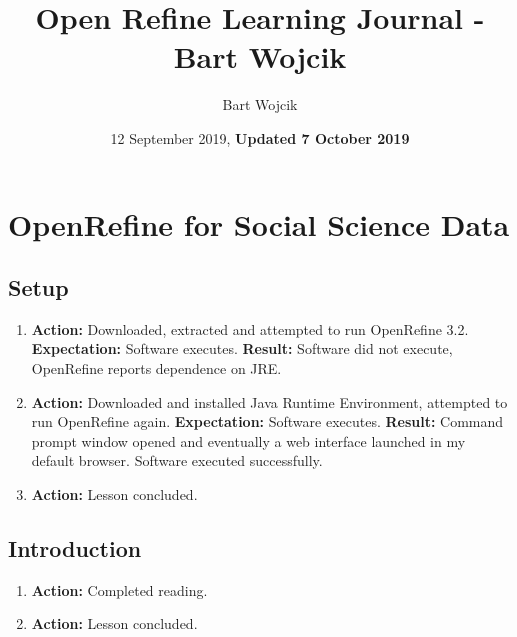 \documentclass{article}
\title{Open Refine Learning Journal   - Bart Wojcik}
\author{Bart Wojcik}
\date{12 September 2019, \textbf{Updated 7 October 2019}}
\begin{document}
\maketitle

\section{OpenRefine for Social Science Data}
\subsection{Setup}
\begin{enumerate}
    \item \textbf{Action: }Downloaded, extracted and attempted to run OpenRefine 3.2.
    \subitem \textbf{Expectation: }Software executes. 
    \subitem \textbf{Result: }Software did not execute, OpenRefine reports dependence on JRE.
    \item \textbf{Action: }Downloaded and installed Java Runtime Environment, attempted to run OpenRefine again. 
    \subitem \textbf{Expectation: }Software executes.
    \subitem \textbf{Result: }Command prompt window opened and eventually a web interface launched in my default browser. Software executed successfully.
    \item \textbf{Action: }Lesson concluded.
\end{enumerate}
\subsection{Introduction}
\begin{enumerate}
    \item \textbf{Action: }Completed reading.
    \item \textbf{Action: }Lesson concluded.
\end{enumerate}
\end{document}
